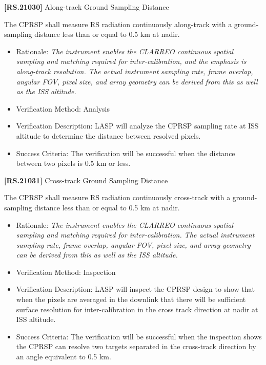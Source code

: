 \documentclass[12pt,oneside,oldfontcommands]{memoir}
\begin{document}
\textbf{[RS.21030]} Along-track Ground Sampling Distance

The \gls{CPRSP} shall \gls{measure} \gls{RS} radiation continuously along-track with a ground-sampling distance less than or equal to 0.5 km at nadir.

\begin{itemize}
\item{} Rationale: \emph{The instrument enables the CLARREO continuous spatial sampling and matching required for inter-calibration, and the emphasis is along-track resolution. The actual instrument sampling rate, frame overlap, angular FOV, pixel size, and array geometry can be derived from this as well as the ISS altitude.}

\item{} Verification Method: Analysis

\item{} Verification Description: \gls{LASP} will analyze the \gls{CPRSP} sampling rate at \gls{ISS} altitude to determine the distance between resolved pixels.

\item{} Success Criteria: The verification will be successful when the distance between two pixels is 0.5 km or less.

\end{itemize}

\textbf{[RS.21031]} Cross-track Ground Sampling Distance

The \gls{CPRSP} shall \gls{measure} \gls{RS} radiation continuously cross-track with a ground-sampling distance less than or equal to 0.5 km at nadir.

\begin{itemize}
\item{} Rationale: \emph{The instrument enables the CLARREO continuous spatial sampling and matching required for inter-calibration. The actual instrument sampling rate, frame overlap, angular FOV, pixel size, and array geometry can be derived from this as well as the ISS altitude.}

\item{} Verification Method: Inspection

\item{} Verification Description: \gls{LASP} will inspect the \gls{CPRSP} design to show that when the pixels are averaged in the downlink that there will be sufficient surface resolution for inter-calibration in the cross track direction at nadir at \gls{ISS} altitude.

\item{} Success Criteria: The verification will be successful when the \gls{inspection} shows the \gls{CPRSP} can resolve two targets separated in the cross-track direction by an angle equivalent to 0.5 km.

\end{itemize}
\end{document}

